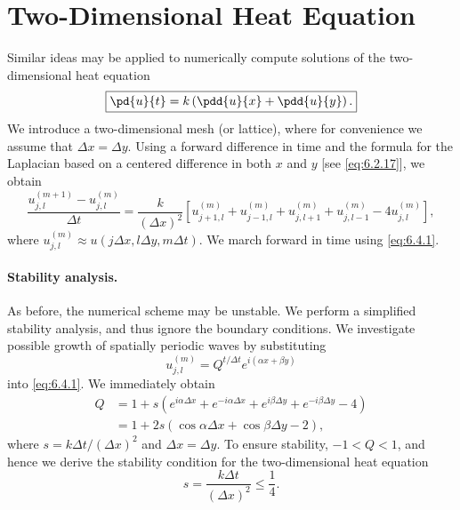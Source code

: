 \section{Two-Dimensional Heat Equation}
\label{sec:fd-2d-heat}

Similar ideas may be applied to numerically compute solutions of the two-dimensional heat equation
\begin{equation*}
\boxed{\pd{u}{t} = k\left(\pdd{u}{x} + \pdd{u}{y}\right).}
\end{equation*}
We introduce a two-dimensional mesh (or lattice), where for convenience we assume that $\Delta x = \Delta y$.  Using a forward difference in time and the formula for the Laplacian based on a centered difference in both $x$ and $y$ [see \eqref{eq:6.2.17}], we obtain
\begin{equation}
\boxed{\frac{u_{j,l}^{(m+1)} - u_{j,l}^{(m)}}{\Delta t} = \frac{k}{(\Delta x)^2}\left[u_{j+1,l}^{(m)} + u_{j-1,l}^{(m)} + u_{j,l+1}^{(m)} + u_{j,l-1}^{(m)} - 4u_{j,l}^{(m)}\right],}
\label{eq:6.4.1}
\end{equation}
where $u_{j,l}^{(m)} \approx u(j\Delta x, l\Delta y, m\Delta t)$.  We march forward in time using \eqref{eq:6.4.1}.

\paragraph{Stability analysis.}
As before, the numerical scheme may be unstable.  We perform a simplified stability analysis, and thus ignore the boundary conditions.  We investigate possible growth of spatially periodic waves by substituting
\begin{equation}
u_{j,l}^{(m)} = Q^{t/\Delta t}e^{i(\alpha x + \beta y)}
\label{eq:6.4.2}
\end{equation}
into \eqref{eq:6.4.1}.  We immediately obtain
\begin{align*}
Q &= 1 + s\left(e^{i\alpha\Delta x} + e^{-i\alpha\Delta x} + e^{i\beta\Delta y} + e^{-i\beta\Delta y} - 4\right) \\
&= 1 + 2s(\cos\alpha\Delta x + \cos\beta\Delta y - 2),
\end{align*}
where $s = k\Delta t/(\Delta x)^2$ and $\Delta x = \Delta y$.  To ensure stability, $-1 < Q < 1$, and hence we derive the stability condition for the two-dimensional heat equation
\begin{equation}
\boxed{s = \frac{k\Delta t}{(\Delta x)^2} \le \frac{1}{4}.}
\label{eq:6.4.3}
\end{equation}

